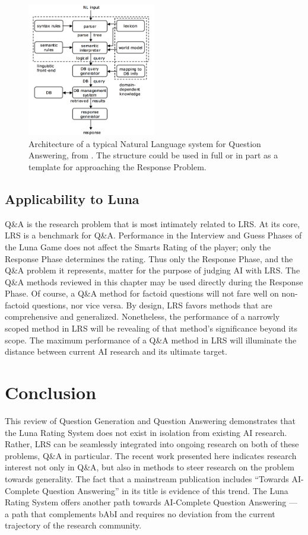 \begin{figure}[h]
\centerline{%
\includegraphics[width=0.5\textwidth]{figures/NLPQA.png}}%
\caption{Architecture of a typical Natural Language system for Question Answering, from \citep{androutsopoulos1995natural}. The structure could be used in full or in part as a template for approaching the Response Problem.}
\label{fig:NLPQA}
\end{figure}


\subsection{Applicability to Luna}

Q\&A is the research problem that is most intimately related to LRS. At its core, LRS is a benchmark for Q\&A. Performance in the Interview and Guess Phases of the Luna Game does not affect the Smarts Rating of the player; only the Response Phase determines the rating. Thus only the Response Phase, and the Q\&A problem it represents, matter for the purpose of judging AI with LRS. The Q\&A methods reviewed in this chapter may be used directly during the Response Phase. Of course, a Q\&A method for factoid questions will not fare well on non-factoid questions, nor vice versa. By design, LRS favors methods that are comprehensive and generalized. Nonetheless, the performance of a narrowly scoped method in LRS will be revealing of that method's significance beyond its scope. The maximum performance of a Q\&A method in LRS will illuminate the distance between current AI research and its ultimate target.



\section{Conclusion}

This review of Question Generation and Question Answering demonstrates that the Luna Rating System does not exist in isolation from existing AI research. Rather, LRS can be seamlessly integrated into ongoing research on both of these problems, Q\&A in particular. The recent work presented here indicates research interest not only in Q\&A, but also in methods to steer research on the problem towards generality. The fact that a mainstream publication includes ``Towards AI-Complete Question Answering'' in its title is evidence of this trend. The Luna Rating System offers another path towards AI-Complete Question Answering --- a path that complements bAbI and requires no deviation from the current trajectory of the research community.

